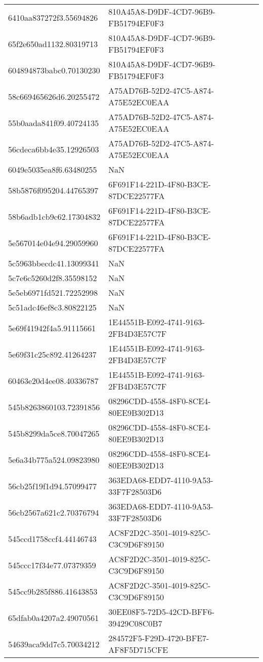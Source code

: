 \begin{tabular}{ll}
6410aa837272f3.55694826 & 810A45A8-D9DF-4CD7-96B9-FB51794EF0F3 \\
65f2e650ad1132.80319713 & 810A45A8-D9DF-4CD7-96B9-FB51794EF0F3 \\
604894873babc0.70130230 & 810A45A8-D9DF-4CD7-96B9-FB51794EF0F3 \\
58c669465626d6.20255472 & A75AD76B-52D2-47C5-A874-A75E52EC0EAA \\
55b0aada841f09.40724135 & A75AD76B-52D2-47C5-A874-A75E52EC0EAA \\
56cdeca6bb4e35.12926503 & A75AD76B-52D2-47C5-A874-A75E52EC0EAA \\
6049e5035ea8f6.63480255 & NaN \\
58b5876f095204.44765397 & 6F691F14-221D-4F80-B3CE-87DCE22577FA \\
58b6adb1cb9c62.17304832 & 6F691F14-221D-4F80-B3CE-87DCE22577FA \\
5e567014e04e94.29059960 & 6F691F14-221D-4F80-B3CE-87DCE22577FA \\
5c5963bbecdc41.13099341 & NaN \\
5c7e6c5260d2f8.35598152 & NaN \\
5e5eb6971fd521.72252998 & NaN \\
5c51adc46ef8c3.80822125 & NaN \\
5e69f41942f4a5.91115661 & 1E44551B-E092-4741-9163-2FB4D3E57C7F \\
5e69f31c25c892.41264237 & 1E44551B-E092-4741-9163-2FB4D3E57C7F \\
60463e20d4ee08.40336787 & 1E44551B-E092-4741-9163-2FB4D3E57C7F \\
545b8263860103.72391856 & 08296CDD-4558-48F0-8CE4-80EE9B302D13 \\
545b8299da5ce8.70047265 & 08296CDD-4558-48F0-8CE4-80EE9B302D13 \\
5e6a34b775a524.09823980 & 08296CDD-4558-48F0-8CE4-80EE9B302D13 \\
56cb25f19f1d94.57099477 & 363EDA68-EDD7-4110-9A53-33F7F28503D6 \\
56cb2567a621c2.70376794 & 363EDA68-EDD7-4110-9A53-33F7F28503D6 \\
545ccd1758ccf4.44146743 & AC8F2D2C-3501-4019-825C-C3C9D6F89150 \\
545ccc17f34e77.07379359 & AC8F2D2C-3501-4019-825C-C3C9D6F89150 \\
545cc9b285f886.41643853 & AC8F2D2C-3501-4019-825C-C3C9D6F89150 \\
65dfab0a4207a2.49070561 & 30EE08F5-72D5-42CD-BFF6-39429C08C0B7 \\
54639aca9dd7c5.70034212 & 284572F5-F29D-4720-BFE7-AF8F5D715CFE \\

\end{tabular}
